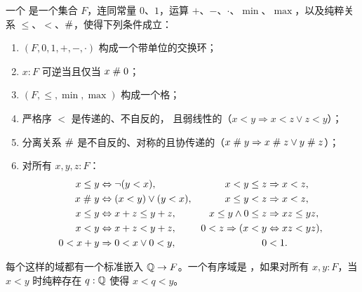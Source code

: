 \begin{defn} \label{ordered-field} 一个
  是一个集合 $F$，连同常量 $0$、$1$，运算 $+$、$-$、$\cdot$、$\min$、$\max$，以及纯粹关系 $\leq$、$<$、$\mathrel{\#}$，使得下列条件成立：
  \begin{enumerate}
  \item $(F, 0, 1, {+}, {-}, {\cdot})$ 构成一个带单位的交换环；
  \item $x : F$ 可逆当且仅当 $x \mathrel{\#} 0$；
  \item $(F, {\leq}, {\min}, {\max})$ 构成一个格；
  \item 严格序 $<$ 是传递的、不自反的，
    且弱线性的（$x < y \Rightarrow x < z \lor z < y$）；
  \item 分离关系 $\mathrel{\#}$ 是不自反的、对称的且协传递的（$x \mathrel{\#} y \Rightarrow x \mathrel{\#} z \lor y \mathrel{\#} z$）；
  \item 对所有 $x, y, z : F$：
    \begin{align*}
      x \leq y &\Leftrightarrow \lnot (y < x), &
      x < y \leq z &\Rightarrow x < z, \\
      x \mathrel{\#} y &\Leftrightarrow (x < y) \lor (y < x), &
      x \leq y < z &\Rightarrow x < z, \\
      x \leq y &\Leftrightarrow x + z \leq y + z, &
      x \leq y \land 0 \leq z &\Rightarrow x z \leq y z, \\
      x < y &\Leftrightarrow x + z < y + z, &
      0 < z \Rightarrow (x < y &\Leftrightarrow x z < y z), \\
      0 < x + y &\Rightarrow 0 < x \lor 0 < y, &
      0 &< 1.
    \end{align*}
  \end{enumerate}
  每个这样的域都有一个标准嵌入 $\mathbb{Q} \to F$。一个有序域是
  ，如果对所有 $x, y : F$，当 $x < y$ 时纯粹存在 $q :
  \mathbb{Q}$ 使得 $x < q < y$。
\end{defn}

